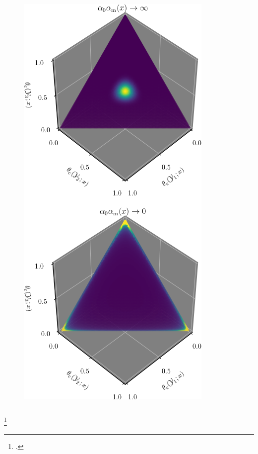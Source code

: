 \documentclass[aspectratio=169]{beamer}
\begin{document}
\begin{frame}
\begin{columns}[c]
\begin{column}{.2\linewidth}
\begin{figure}
\centering
\includegraphics[width=1\linewidth]{SSP_2021/presentation/dir_loc.png}
\end{figure}

\end{column}

\end{columns}

\footcitetext{ferguson}


\end{frame}
\end{document}
